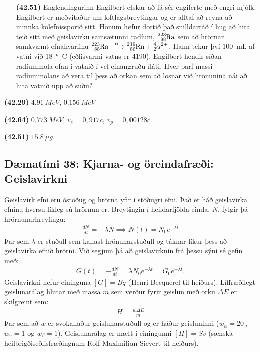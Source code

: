 \ifdefined \wholebook \else\documentclass[oneside]{book}\usepackage{EdlBook}\graphicspath{{figures/}}
\begin{document}
\begin{enumerate}[label = \textbf{(\alph*)}]
\item[\textbf{(42.51)}] Englendingurinn Engilbert elskar að fá sér engiferte með engri mjólk. Engilbert er meðvitaður um loftlagsbreytingar og er alltaf að reyna að minnka kolefnissporið sitt. Honum hefur dottið það snilldarráð í hug að hita teið sitt með geislavirku samsætunni radíum, $\ce{^{223}_{88}Ra}$ sem að hrörnar samkvæmt efnahvarfinu $\ce{^{223}_{88}Ra ->[\alpha] ^{219}_{86}Rn + ^{4}_{2}\alpha^{2+}}$. Hann tekur því \SI{100}{mL} af vatni við \SI{18}{\degree C} (eðlisvarmi vatns er \SI{4190}{}). Engilbert hendir síðan radíummola ofan í vatnið í vel einangruðu íláti. Hver þarf massi radíummolans að vera til þess að orkan sem að losnar við hrönunina nái að hita vatnið upp að suðu?

\end{enumerate}

\begin{tcolorbox}
\begin{enumerate*}[label = ]
  \item \textbf{(42.29)} $\SI{4.91}{MeV}$, $\SI{0.156}{MeV}$
  \item \textbf{(42.64)} $\SI{0.773}{MeV}$, $v_e = 0,917c$, $v_p = 0,00128c$.
  \item \textbf{(42.51)} $\SI{15.8}{\mu g}$.
\end{enumerate*}
\end{tcolorbox}

\newpage

\subsection*{Dæmatími 38: Kjarna- og öreindafræði: Geislavirkni}

\begin{tcolorbox}
Geislavirk efni eru óstöðug og hrörna yfir í stöðugri efni. Það er háð geislavirka efninu hversu líkleg sú hrörnun er. Breytingin í heildarfjölda einda, $N$, fylgir þá hrörnunarhreyfingu:
\begin{align*}
    \frac{dN}{dt} = -\lambda N \implies N(t) = N_0e^{-\lambda t}
\end{align*}
Þar sem $\lambda$ er stuðull sem kallast hrönunarstuðull og táknar líkur þess að geislavirka efnið hrörni. Við segjum þá að geislavirknin frá þessu sýni sé gefin með:
\begin{align*}
    G(t) = -\frac{dN}{dt} = \lambda N_0 e^{-\lambda t} = G_0 e^{-\lambda t}.
\end{align*}
Geislavirkni hefur eininguna $\left[ G \right] = \si{Bq}$ (Henri Becquerel til heiðurs). Líffræðilegt geislunarálag hlutar með massa $m$ sem verður fyrir geislun með orku $\Delta E$ er skilgreint sem:
\begin{align*}
    H = \frac{w\Delta E}{m}
\end{align*}
Þar sem að $w$ er svokallaður geislunarstuðull og er háður geisluninni ($w_\alpha = \SI{20}{}$, $w_\gamma = 1$ og $w_\beta = 1$). Geislunarálag er mælt í einingunni $\left[ H \right] = \si{Sv}$ (sænska heilbrigðiseðlisfræðingnum Rolf Maximilian Sievert til heiðurs).

\end{tcolorbox}
\end{document}
